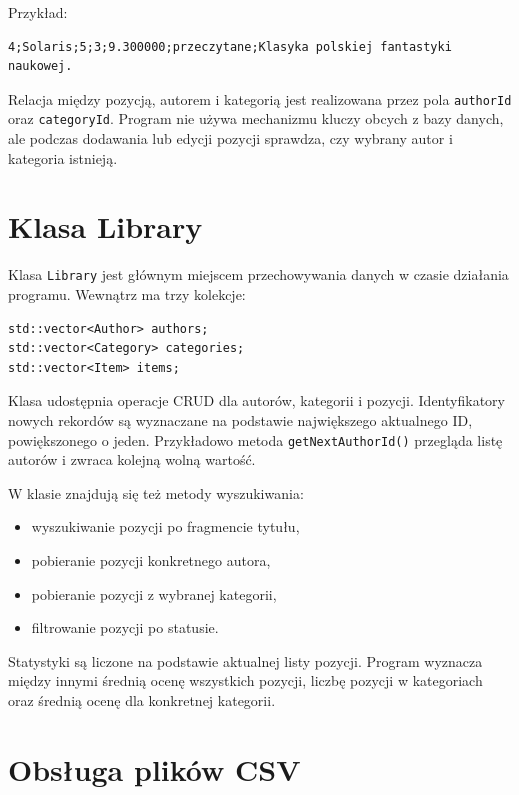 \documentclass[12pt,a4paper]{article}
\begin{document}
Przykład:

\begin{lstlisting}
4;Solaris;5;3;9.300000;przeczytane;Klasyka polskiej fantastyki naukowej.
\end{lstlisting}

Relacja między pozycją, autorem i kategorią jest realizowana przez pola
\texttt{authorId} oraz \texttt{categoryId}. Program nie używa mechanizmu kluczy
obcych z bazy danych, ale podczas dodawania lub edycji pozycji sprawdza, czy wybrany
autor i kategoria istnieją.

\section{Klasa Library}

Klasa \texttt{Library} jest głównym miejscem przechowywania danych w czasie działania
programu. Wewnątrz ma trzy kolekcje:

\begin{lstlisting}
std::vector<Author> authors;
std::vector<Category> categories;
std::vector<Item> items;
\end{lstlisting}

Klasa udostępnia operacje CRUD dla autorów, kategorii i pozycji. Identyfikatory nowych
rekordów są wyznaczane na podstawie największego aktualnego ID, powiększonego o jeden.
Przykładowo metoda \texttt{getNextAuthorId()} przegląda listę autorów i zwraca kolejną
wolną wartość.

W klasie znajdują się też metody wyszukiwania:

\begin{itemize}
    \item wyszukiwanie pozycji po fragmencie tytułu,
    \item pobieranie pozycji konkretnego autora,
    \item pobieranie pozycji z wybranej kategorii,
    \item filtrowanie pozycji po statusie.
\end{itemize}

Statystyki są liczone na podstawie aktualnej listy pozycji. Program wyznacza między
innymi średnią ocenę wszystkich pozycji, liczbę pozycji w kategoriach oraz średnią ocenę
dla konkretnej kategorii.

\section{Obsługa plików CSV}
\end{document}
